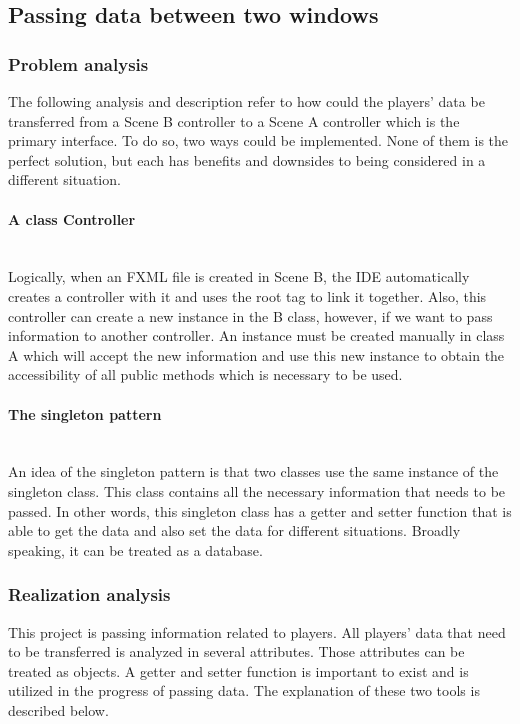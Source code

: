 \subsection{Passing data between two windows}

\subsubsection{Problem analysis}

The following analysis and description refer to how could the players' data be transferred from a Scene B controller to a Scene A controller which is the primary interface. To do so, two ways could be implemented. None of them is the perfect solution, but each has benefits and downsides to being considered in a different situation.

\paragraph{A class Controller } \mbox{}\\

Logically, when an FXML file is created in Scene B, the IDE automatically creates a controller with it and uses the root tag to link it together. Also, this controller can create a new instance in the B class, however, if we want to pass information to another controller. An instance must be created manually in class A which will accept the new information and use this new instance to obtain the accessibility of all public methods which is necessary to be used.  

\paragraph{The singleton pattern} \mbox{}\\

An idea of the singleton pattern is that two classes use the same instance of the singleton class. This class contains all the necessary information that needs to be passed. In other words, this singleton class has a getter and setter function that is able to get the data and also set the data for different situations. Broadly speaking, it can be treated as a database. 

\subsubsection{Realization analysis}

This project is passing information related to players. All players' data that need to be transferred is analyzed in several attributes. Those attributes can be treated as objects. A getter and setter function is important to exist and is utilized in the progress of passing data. The explanation of these two tools is described below.   

